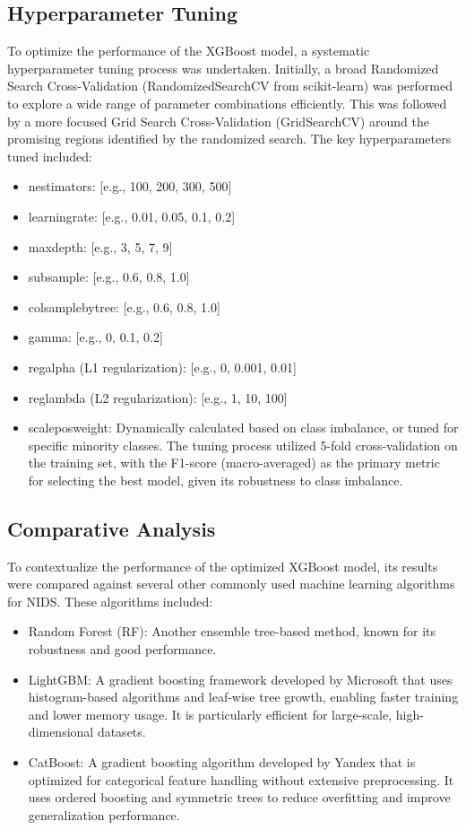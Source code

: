 \subsection{Hyperparameter Tuning}
To optimize the performance of the XGBoost model, a systematic hyperparameter tuning process was undertaken. Initially, a broad Randomized Search Cross-Validation (RandomizedSearchCV from scikit-learn) was performed to explore a wide range of parameter combinations efficiently. This was followed by a more focused Grid Search Cross-Validation (GridSearchCV) around the promising regions identified by the randomized search. The key hyperparameters tuned included:
\begin{itemize}
	\item n\textunderscore estimators: [e.g., 100, 200, 300, 500]
	\item learning\textunderscore rate: [e.g., 0.01, 0.05, 0.1, 0.2]
	\item max\textunderscore depth: [e.g., 3, 5, 7, 9]
	\item subsample: [e.g., 0.6, 0.8, 1.0]
	\item colsample\textunderscore bytree: [e.g., 0.6, 0.8, 1.0]
	\item gamma: [e.g., 0, 0.1, 0.2]
	\item reg\textunderscore alpha (L1 regularization): [e.g., 0, 0.001, 0.01]
	\item  reg\textunderscore lambda (L2 regularization): [e.g., 1, 10, 100]
	\item scale\textunderscore pos\textunderscore weight: Dynamically calculated based on class imbalance, or tuned for specific minority classes. The tuning process utilized 5-fold cross-validation on the training set, with the F1-score (macro-averaged) as the primary metric for selecting the best model, given its robustness to class imbalance.
\end{itemize}

\subsection{Comparative Analysis}
To contextualize the performance of the optimized XGBoost model, its results were compared against several other commonly used machine learning algorithms for NIDS. These algorithms included:
\begin{itemize}
	\item Random Forest (RF): Another ensemble tree-based method, known for its robustness and good performance.
	\item LightGBM: A gradient boosting framework developed by Microsoft that uses histogram-based algorithms and leaf-wise tree growth, enabling faster training and lower memory usage. It is particularly efficient for large-scale, high-dimensional datasets.
	\item CatBoost: A gradient boosting algorithm developed by Yandex that is optimized for categorical feature handling without extensive preprocessing. It uses ordered boosting and symmetric trees to reduce overfitting and improve generalization performance.
\end{itemize}


